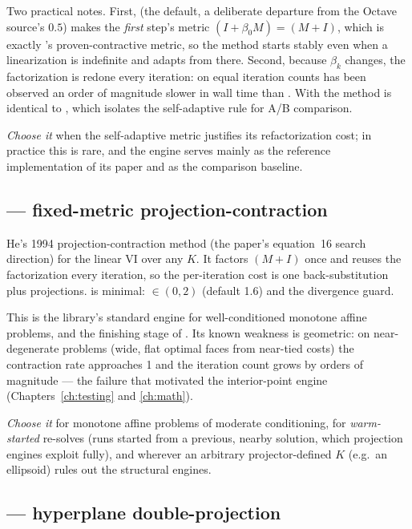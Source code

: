 Two practical notes. First,  (the default, a deliberate
departure from the Octave source's $0.5$) makes the \emph{first} step's
metric $(I + \beta_0 M) = (M + I)$, which is exactly 's
proven-contractive metric, so the method starts stably even when a
linearization is indefinite and adapts from there. Second, because $\beta_k$
changes, the factorization is redone every iteration: on equal iteration
counts  has been observed an order of magnitude slower in wall
time than . With  the method is
identical to , which isolates the self-adaptive rule for
A/B comparison.

\emph{Choose it} when the self-adaptive metric justifies its
refactorization cost; in practice this is rare, and the engine serves
mainly as the reference implementation of its paper and as the comparison
baseline.

\subsection{ --- fixed-metric projection-contraction}
\label{sec:bshe94b}

He's 1994 projection-contraction method (the paper's equation~16 search
direction) for the linear VI over any $K$. It factors $(M + I)$ once
and reuses the factorization every iteration, so the per-iteration cost is
one back-substitution plus projections.  is minimal:
 $\in (0,2)$ (default 1.6) and the divergence guard.

This is the library's standard engine for well-conditioned monotone affine
problems, and the finishing stage of . Its known
weakness is geometric: on near-degenerate problems (wide, flat optimal
faces from near-tied costs) the contraction rate approaches 1 and the
iteration count grows by orders of magnitude --- the failure that motivated
the interior-point engine (Chapters~\ref{ch:testing} and \ref{ch:math}).

\emph{Choose it} for monotone affine problems of moderate conditioning,
for \emph{warm-started} re-solves (runs started from a previous, nearby
solution, which projection engines exploit fully), and wherever
an arbitrary projector-defined $K$ (e.g.\ an ellipsoid) rules out the
structural engines.

\subsection{ --- hyperplane double-projection}
\label{sec:ss}


